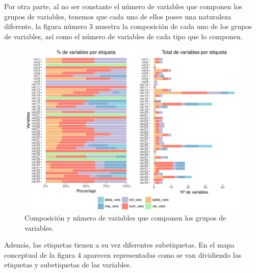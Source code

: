 \documentclass[11pt,a4paper,spanish]{article} %
\begin{document}
Por otra parte, al no ser constante el número de variables que componen los grupos de variables, tenemos que cada uno de ellos posee una naturaleza diferente, la figura número 3 muestra la composición de cada uno de los grupos de variables, así como el número de variables de cada tipo que lo componen. 

\vspace{0.8cm}


\begin{figure}[h!]
	\begin{center}
	\includegraphics[width=\textwidth]{Z_01_03_Grafico_etiquetas_variables.pdf}
    \caption{Composición y número de variables que componen los grupos de variables.}
    \end{center}
\end{figure}


\newpage

Además, las etiquetas tienen a su vez diferentes subetiquetas. En el mapa conceptual de la figura 4 aparecen representadas como se van dividiendo las etiquetas y subetiquetas de las variables.
\end{document}
